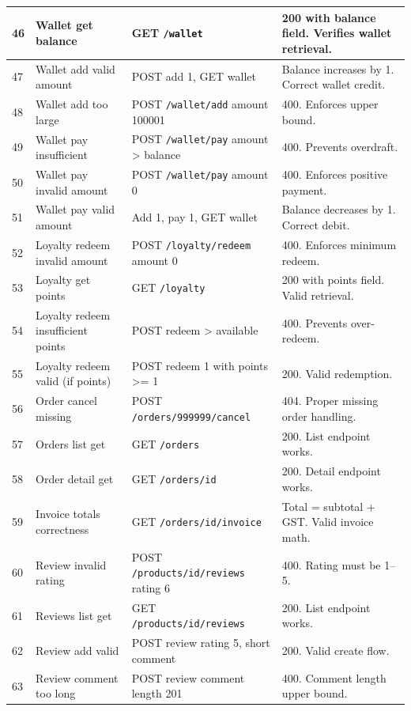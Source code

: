 \documentclass[11pt]{article}
\begin{document}
\begin{longtable}{|p{0.7cm}|p{3.2cm}|p{6.7cm}|p{3.2cm}|}
\hline
46 & Wallet get balance & GET \texttt{/wallet} & 200 with balance field. Verifies wallet retrieval. \\
\hline
47 & Wallet add valid amount & POST add 1, GET wallet & Balance increases by 1. Correct wallet credit. \\
\hline
48 & Wallet add too large & POST \texttt{/wallet/add} amount 100001 & 400. Enforces upper bound. \\
\hline
49 & Wallet pay insufficient & POST \texttt{/wallet/pay} amount > balance & 400. Prevents overdraft. \\
\hline
50 & Wallet pay invalid amount & POST \texttt{/wallet/pay} amount 0 & 400. Enforces positive payment. \\
\hline
51 & Wallet pay valid amount & Add 1, pay 1, GET wallet & Balance decreases by 1. Correct debit. \\
\hline
52 & Loyalty redeem invalid amount & POST \texttt{/loyalty/redeem} amount 0 & 400. Enforces minimum redeem. \\
\hline
53 & Loyalty get points & GET \texttt{/loyalty} & 200 with points field. Valid retrieval. \\
\hline
54 & Loyalty redeem insufficient points & POST redeem > available & 400. Prevents over-redeem. \\
\hline
55 & Loyalty redeem valid (if points) & POST redeem 1 with points >= 1 & 200. Valid redemption. \\
\hline
56 & Order cancel missing & POST \texttt{/orders/999999/cancel} & 404. Proper missing order handling. \\
\hline
57 & Orders list get & GET \texttt{/orders} & 200. List endpoint works. \\
\hline
58 & Order detail get & GET \texttt{/orders/{id}} & 200. Detail endpoint works. \\
\hline
59 & Invoice totals correctness & GET \texttt{/orders/{id}/invoice} & Total = subtotal + GST. Valid invoice math. \\
\hline
60 & Review invalid rating & POST \texttt{/products/{id}/reviews} rating 6 & 400. Rating must be 1--5. \\
\hline
61 & Reviews list get & GET \texttt{/products/{id}/reviews} & 200. List endpoint works. \\
\hline
62 & Review add valid & POST review rating 5, short comment & 200. Valid create flow. \\
\hline
63 & Review comment too long & POST review comment length 201 & 400. Comment length upper bound. \\

\end{longtable}
\end{document}
